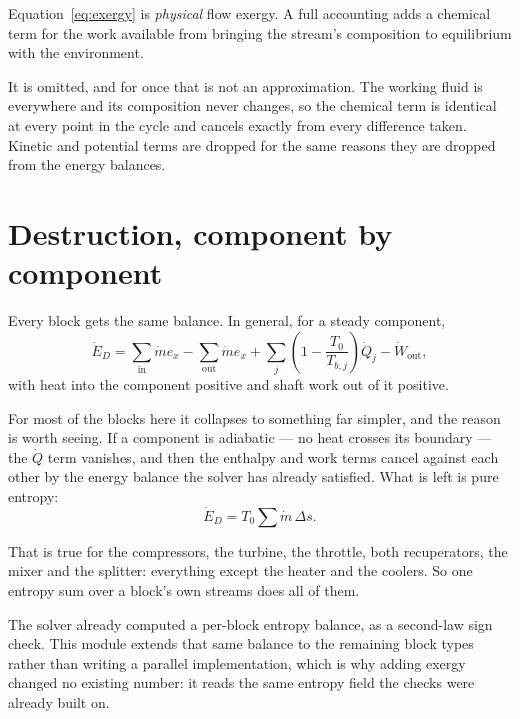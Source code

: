 \documentclass[11pt,a4paper]{report}
\begin{document}
\begin{caveat}[title={Caveat: physical exergy only, and that is correct here}]
Equation~\eqref{eq:exergy} is \emph{physical} flow exergy. A full accounting
adds a chemical term for the work available from bringing the stream's
composition to equilibrium with the environment.

It is omitted, and for once that is not an approximation. The working fluid
is  everywhere and its composition never changes, so the chemical
term is identical at every point in the cycle and cancels exactly from every
difference taken. Kinetic and potential terms are dropped for the same
reasons they are dropped from the energy balances.
\end{caveat}

\section{Destruction, component by component}

Every block gets the same balance. In general, for a steady component,
\[
  \dot E_D = \sum_{\text{in}} \dot m e_x
           - \sum_{\text{out}} \dot m e_x
           + \sum_j \left(1 - \frac{T_0}{T_{b,j}}\right)\dot Q_j
           - \dot W_{\text{out}},
\]
with heat into the component positive and shaft work out of it positive.

For most of the blocks here it collapses to something far simpler, and the
reason is worth seeing. If a component is adiabatic --- no heat crosses its
boundary --- the $\dot Q$ term vanishes, and then the enthalpy and work
terms cancel against each other by the energy balance the solver has
already satisfied. What is left is pure entropy:
\[
  \dot E_D = T_0 \sum \dot m \,\Delta s .
\]

That is true for the compressors, the turbine, the throttle, both
recuperators, the mixer and the splitter: everything except the heater and
the coolers. So one entropy sum over a block's own streams does all of
them.


\begin{choicebox}
The solver already computed a per-block entropy balance, as a second-law
sign check. This module extends that same balance to the remaining block
types rather than writing a parallel implementation, which is why adding
exergy changed no existing number: it reads the same entropy field the
checks were already built on.
\end{choicebox}
\end{document}
